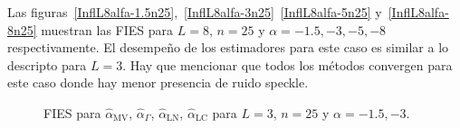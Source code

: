 Las figuras~\ref{InflL8alfa-1.5n25},~\ref{InflL8alfa-3n25}~\ref{InflL8alfa-5n25} y~\ref{InflL8alfa-8n25} muestran las FIES para $L=8$, $n=25$ y $\alpha=-1.5, -3, -5, -8$ respectivamente. El desempeño de los estimadores para este caso es similar a lo descripto para $L=3$. Hay que mencionar que todos los métodos convergen para este caso donde hay menor presencia de ruido speckle. 

\begin{figure}[htb]
	\caption{\label{InflL3n25}\small FIES para $\widehat{\alpha}_{\text{MV}}$, $\widehat{\alpha}_{\Gamma}$, $\widehat{\alpha}_{\text{LN}}$, $\widehat{\alpha}_{\text{LC}}$ para $L=3$, $n=25$ y $\alpha=-1.5,-3$.}
\end{figure}

